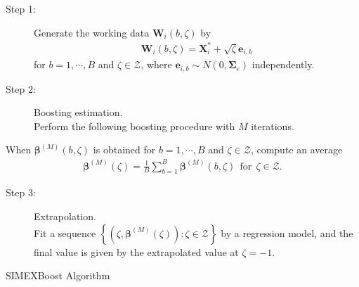 \begin{algorithm}[H]
\begin{description}
    \item[Step 1:] Generate the working data $\mathbf{W}_i(b,\zeta)$ by
    \begin{eqnarray} \label{Sim_W}
\mathbf{W}_i \left(b,\zeta\right) = \mathbf{X}_i^\ast + \sqrt{\zeta} \mathbf{e}_{i,b}
\end{eqnarray}
for $b=1,\cdots,B$ and $\zeta \in \mathcal{Z}$, where $\mathbf{e}_{i,b} \sim N(0,\boldsymbol{\Sigma}_e)$ independently.
    
    \item[Step 2:] Boosting estimation.\\  Perform the following boosting procedure with $M$ iterations.
\end{description}    
When $\boldsymbol{\beta}^{(M)}(b,\zeta)$ is obtained for $b=1,\cdots,B$ and $\zeta \in \mathcal{Z}$, compute an average 
\begin{eqnarray} \label{SIMEX-ave}
\boldsymbol{\beta}^{(M)}(\zeta) = \frac{1}{B} \sum \limits_{b=1}^B \boldsymbol{\beta}^{(M)}(b,\zeta) \ \ \text{for}\ \ \zeta \in \mathcal{Z}.
\end{eqnarray}


\begin{description}
\item[Step 3:] Extrapolation.
\\
Fit a sequence $\left\{ \left( \zeta, \boldsymbol{\beta}^{(M)} (\zeta) \right) : \zeta \in \mathcal{Z} \right\}$ by a regression model, and the final value is given by the extrapolated value at $\zeta=-1$.
 
    
    
\end{description}



 \caption{SIMEXBoost Algorithm} \label{algo-SIMEX}
\end{algorithm}




